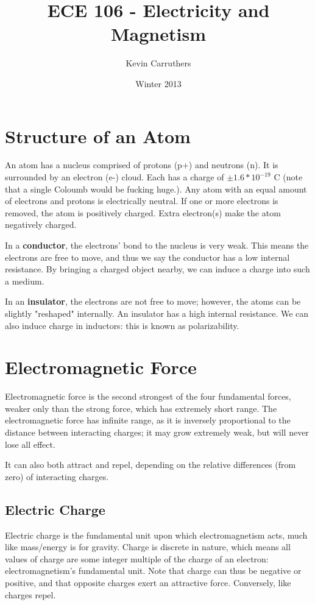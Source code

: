 \documentclass[12pt]{article}
\begin{document}
\title{ECE 106 - Electricity and Magnetism}
\author{Kevin Carruthers}
\date{\vspace{-2ex}Winter 2013}
\maketitle\HRule

\section*{Structure of an Atom}
An atom has a nucleus comprised of protons (p+) and neutrons (n). It is surrounded by an electron (e-) cloud. Each has a charge of $\pm 1.6*10^{-19}$ C (note that a single Coloumb would be fucking huge.). Any atom with an equal amount of electrons and protons is electrically neutral. If one or more electrons is removed, the atom is positively charged. Extra electron(s) make the atom negatively charged.

In a {\bf conductor}, the electrons' bond to the nucleus is very weak. This means the electrons are free to move, and thus we say the conductor has a low internal resistance. By bringing a charged object nearby, we can induce a charge into such a medium.

In an {\bf insulator}, the electrons are not free to move; however, the atoms can be slightly "reshaped" internally. An insulator has a high internal resistance. We can also induce charge in inductors: this is known as polarizability.

\section*{Electromagnetic Force}
Electromagnetic force is the second strongest of the four fundamental forces, weaker only than the strong force, which has extremely short range. The electromagnetic force has infinite range, as it is inversely proportional to the distance between interacting charges; it may grow extremely weak, but will never lose all effect.

It can also both attract and repel, depending on the relative differences (from zero) of interacting charges.

\subsection*{Electric Charge}
Electric charge is the fundamental unit upon which electromagnetism acts, much like mass/energy is for gravity. Charge is discrete in nature, which means all values of charge are some integer multiple of the charge of an electron: electromagnetism's fundamental unit. Note that charge can thus be negative or positive, and that opposite charges exert an attractive force. Conversely, like charges repel.
\end{document}
